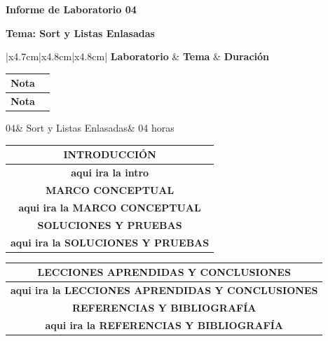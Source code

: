 \documentclass{article}
\newcommand{\itemPracticeNumber}{04}
\newcommand{\itemTheme}{Sort y Listas Enlasadas}
\newcommand{\doble}{\begin{table}
	\begin{tabular}{|c|c|}
		\hline 
		\textbf{Nota}  \\
		\hline 
		\textbf{Nota}  \\
		\hline 			
	\end{tabular}
\end{table}}
\begin{document}
	
	\vspace*{10px}
	
	\begin{center}	
		\fontsize{17}{17} \textbf{ Informe de Laboratorio \itemPracticeNumber}
	\end{center}
	\centerline{\textbf{\Large Tema: \itemTheme}}
	\begin{table}[H]
		\begin{tabular}{|x{4.7cm}|x{4.8cm}|x{4.8cm}|}
			\hline 
			\color{white}\textbf{Laboratorio} & \color{white}\textbf{Tema}  & \color{white}\textbf{Duración}   \\
			\doble 

			\itemPracticeNumber & \itemTheme & 04 horas   \\
			\hline 
		\end{tabular}
	\end{table}
	\begin{table}[H]
		\begin{tabular}{|c|}
			\hline 
			\rowcolor{tablebackground}
			\color{white}\textbf{INTRODUCCIÓN}  \\
			\hline 
			\textbf{aqui ira la intro}  \\
			\hline 
			\rowcolor{tablebackground}
			\color{white}\textbf{MARCO CONCEPTUAL}  \\
			\hline 
			\textbf{aqui ira la MARCO CONCEPTUAL}  \\
			\hline 
			\rowcolor{tablebackground}
			\color{white}\textbf{SOLUCIONES Y PRUEBAS}  \\
			\hline 
			\textbf{aqui ira la SOLUCIONES Y PRUEBAS}  \\
			\hline 
		\end{tabular}
	\end{table}
	\begin{table}[H]
		\begin{tabular}{|c|}
			\hline 
			\rowcolor{tablebackground}
			\color{white}\textbf{LECCIONES APRENDIDAS Y CONCLUSIONES}  \\
			\hline 
			\textbf{aqui ira la LECCIONES APRENDIDAS Y CONCLUSIONES}  \\
			\hline 
			\rowcolor{tablebackground}
			\color{white}\textbf{REFERENCIAS Y BIBLIOGRAFÍA}  \\
			\hline 
			\textbf{aqui ira la REFERENCIAS Y BIBLIOGRAFÍA}  \\
			\hline 
		\end{tabular}
	\end{table}
\end{document}
